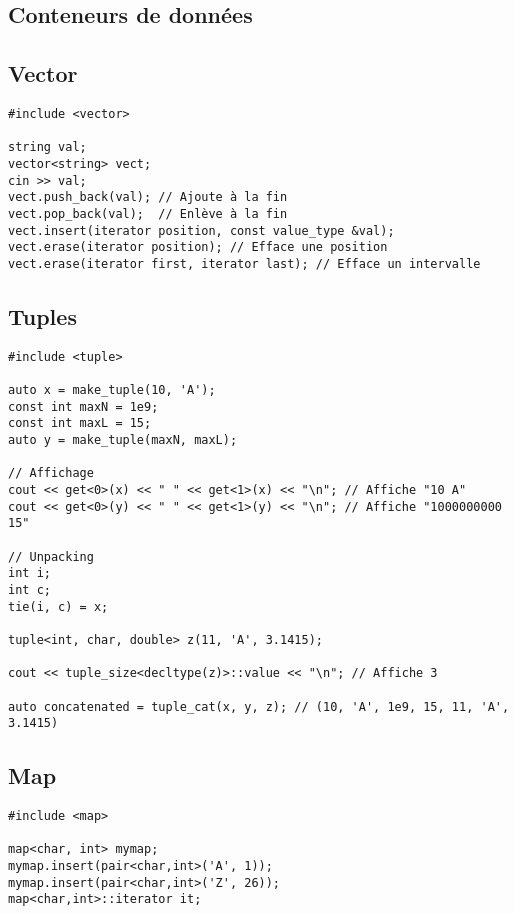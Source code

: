 \documentclass{article}
\begin{document}
\begin{multicols*}{3}
\section*{Conteneurs de données}

\subsection*{Vector}

\begin{lstlisting}
#include <vector>

string val;
vector<string> vect;
cin >> val;
vect.push_back(val); // Ajoute à la fin
vect.pop_back(val);  // Enlève à la fin
vect.insert(iterator position, const value_type &val);
vect.erase(iterator position); // Efface une position
vect.erase(iterator first, iterator last); // Efface un intervalle

\end{lstlisting}

\subsection*{Tuples}

\begin{lstlisting}
#include <tuple>

auto x = make_tuple(10, 'A');
const int maxN = 1e9;
const int maxL = 15;
auto y = make_tuple(maxN, maxL);

// Affichage
cout << get<0>(x) << " " << get<1>(x) << "\n"; // Affiche "10 A"
cout << get<0>(y) << " " << get<1>(y) << "\n"; // Affiche "1000000000 15"

// Unpacking
int i;
int c;
tie(i, c) = x;

tuple<int, char, double> z(11, 'A', 3.1415);

cout << tuple_size<decltype(z)>::value << "\n"; // Affiche 3

auto concatenated = tuple_cat(x, y, z); // (10, 'A', 1e9, 15, 11, 'A', 3.1415)

\end{lstlisting}

\subsection*{Map}

\begin{lstlisting}
#include <map>

map<char, int> mymap;
mymap.insert(pair<char,int>('A', 1));
mymap.insert(pair<char,int>('Z', 26));
map<char,int>::iterator it;


\end{lstlisting}
\end{multicols*}
\end{document}
